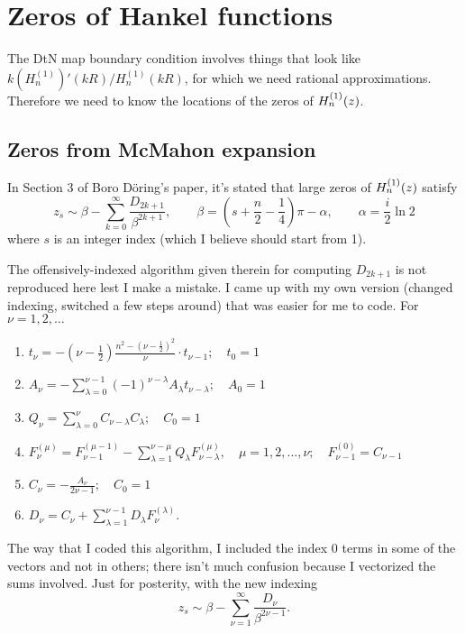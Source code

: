 \section{Zeros of Hankel functions}
\label{sec-hankel_zeros}

The DtN map boundary condition involves things that look like
$k\left(H_n^{(1)}\right)'(kR)/H_n^{(1)}(kR)$, for which we need
rational approximations. Therefore we need to know the locations
of the zeros of $H_n^{(1)}(z)$. 

\subsection{Zeros from McMahon expansion}

In Section 3 of Boro D\"oring's paper,
it's stated that large zeros of $H_n^{(1)}(z)$ satisfy
\[
 z_s \sim \beta - \sum_{k=0}^\infty \frac{D_{2k+1}}{\beta^{2k+1}},
 \qquad
 \beta = \left(s + \frac{n}{2} - \frac14\right)\pi - \alpha,
 \qquad
 \alpha = \frac{i}{2}\ln 2
\]
where $s$ is an integer index (which I believe should start 
from 1).

The offensively-indexed algorithm given therein for computing
$D_{2k+1}$ is not reproduced here lest I make a mistake.
I came up with my own version (changed indexing, switched a
few steps around) that was easier for me to code. 
For $\nu = 1,2,...$
\begin{enumerate}
 \item $t_\nu = -\left(\nu - \frac12\right)
                \frac{n^2 - \left(\nu-\frac12\right)^2}{\nu}
                \cdot t_{\nu-1}; \quad t_0 = 1$
 \item $A_\nu = -\displaystyle\sum_{\lambda=0}^{\nu-1}
                (-1)^{\nu-\lambda} A_\lambda
                t_{\nu-\lambda}; \quad A_0 = 1$
 \item $Q_\nu = \displaystyle\sum_{\lambda=0}^{\nu}
                C_{\nu-\lambda}C_\lambda; \quad C_0 = 1$
 \item $F_\nu^{(\mu)} = F_{\nu-1}^{(\mu-1)} - 
                        \displaystyle\sum_{\lambda=1}^{\nu-\mu}
                        Q_\lambda F_{\nu-\lambda}^{(\mu)},
                        \quad \mu = 1,2,...,\nu;
                        \quad F_{\nu-1}^{(0)} = C_{\nu-1}$
 \item $C_\nu = -\frac{A_\nu}{2\nu-1}; \quad C_0 = 1$
 \item $D_\nu = C_\nu + \displaystyle\sum_{\lambda=1}^{\nu-1}
                        D_\lambda F_\nu^{(\lambda)}$.
\end{enumerate}
The way that I coded this algorithm, I included the index 0
terms in some of the vectors and not in others; there 
isn't much confusion because I vectorized the sums
involved. Just for posterity, with the new indexing
\[
 z_s \sim \beta - \sum_{\nu=1}^\infty
 \frac{D_\nu}{\beta^{2\nu - 1}}.
\]

